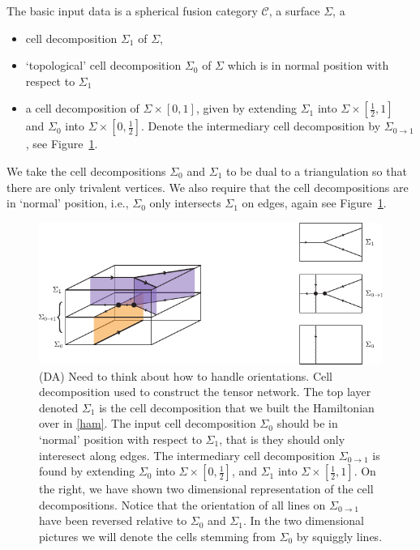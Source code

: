 \documentclass[12pt,a4paper]{article}
\newcounter{arrow}
\newcommand{\ra}{\rightarrow}
\newcommand{\mcc}{\mathcal{C}}
\newcommand{\dave}[1]{{\color{ao(english)}\footnotesize{(DA) #1}}}
\begin{document}
The basic input data is a spherical fusion category $\mcc$, 
a surface $\Sigma$, a
\begin{itemize}
\item cell decomposition $\Sigma_1$ of $\Sigma$, 
\item `topological' cell decomposition $\Sigma_0$ of $\Sigma$ which is in normal position with respect to $\Sigma_1$
\item  a cell decomposition of $\Sigma \times [0,1]$, given by extending $\Sigma_1$ into $\Sigma \times [\frac{1}{2},1]$ and $\Sigma_0$ into $\Sigma \times [0,\frac{1}{2}]$.
Denote the intermediary cell decomposition by $\Sigma_{0\ra 1}$, see Figure~\ref{CellDecomposition}.
\end{itemize}
We take the cell decompositions $\Sigma_0$ and $\Sigma_1$ to be dual to a triangulation so that there are only trivalent vertices. 
We also require that the cell decompositions are in `normal' position, 
i.e., $\Sigma_0$ only intersects $\Sigma_1$ on edges, again see Figure~\ref{CellDecomposition}.
\begin{figure}
\begin{center}
\includegraphics{CellDecomposition.pdf}
\caption{\label{CellDecomposition}
\dave{Need to think about how to handle orientations.}
Cell decomposition used to construct the tensor network.
The top layer denoted $\Sigma_1$ is the cell decomposition that we built the Hamiltonian over in \eqref{ham}.
The input cell decomposition $\Sigma_0$ should be in `normal' position with respect to $\Sigma_1$, that is they should only interesect along edges. 
The intermediary cell decomposition $\Sigma_{0\ra1}$ is found by extending $\Sigma_0$ into 
$\Sigma \times [0,\frac{1}{2}]$, and $\Sigma_{1}$ into $\Sigma \times [\frac{1}{2},1]$.
On the right, we have shown two dimensional representation of the cell decompositions. 
Notice that the orientation of all lines on $\Sigma_{0 \ra1}$ have been reversed relative to $\Sigma_0$ and $\Sigma_1$. 
In the two dimensional pictures we will denote the cells stemming from $\Sigma_0$ by squiggly lines.
}
\end{center}
\end{figure}
\end{document}
